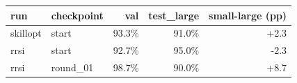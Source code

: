 \begin{tabular}{llrrr}
\toprule
run & checkpoint & val & test\_large & small-large (pp) \\
\midrule
skillopt & start & 93.3\% & 91.0\% & +2.3 \\
rrsi & start & 92.7\% & 95.0\% & -2.3 \\
rrsi & round\_01 & 98.7\% & 90.0\% & +8.7 \\
\bottomrule
\end{tabular}
